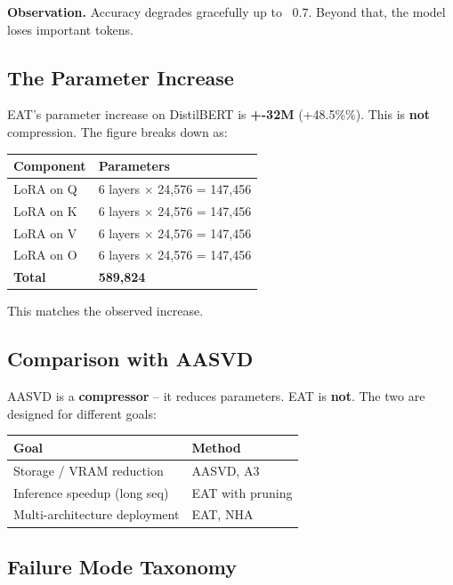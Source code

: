 \textbf{Observation.} Accuracy degrades gracefully up to ~0.7. Beyond that, the 
model loses important tokens.

\subsection{The Parameter Increase}

EAT's parameter increase on DistilBERT is \textbf{+-32M} 
(+48.5\%\%). This is \textbf{not} compression. The figure breaks down as:

\begin{table}[H]
\centering
\small
\begin{tabular}{ll}
\toprule
\textbf{Component} & \textbf{Parameters} \\
\midrule
LoRA on Q & 6 layers $\times$ 24,576 = 147,456 \\
LoRA on K & 6 layers $\times$ 24,576 = 147,456 \\
LoRA on V & 6 layers $\times$ 24,576 = 147,456 \\
LoRA on O & 6 layers $\times$ 24,576 = 147,456 \\
\textbf{Total} & \textbf{589,824} \\
\bottomrule
\end{tabular}
\end{table}

This matches the observed increase.

\subsection{Comparison with AASVD}

AASVD is a \textbf{compressor} -- it reduces parameters. EAT is \textbf{not}. The two 
are designed for different goals:

\begin{table}[H]
\centering
\small
\begin{tabular}{ll}
\toprule
\textbf{Goal} & \textbf{Method} \\
\midrule
Storage / VRAM reduction & AASVD, A3 \\
Inference speedup (long seq) & EAT with pruning \\
Multi-architecture deployment & EAT, NHA \\
\bottomrule
\end{tabular}
\end{table}

\subsection{Failure Mode Taxonomy}

